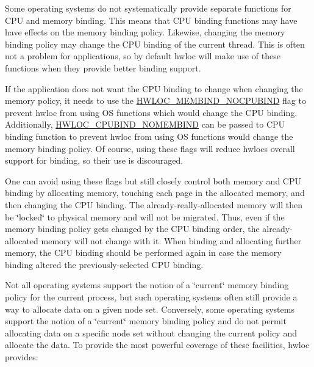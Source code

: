 

Some operating systems do not systematically provide separate functions for C\+PU and memory binding. This means that C\+PU binding functions may have have effects on the memory binding policy. Likewise, changing the memory binding policy may change the C\+PU binding of the current thread. This is often not a problem for applications, so by default hwloc will make use of these functions when they provide better binding support.

If the application does not want the C\+PU binding to change when changing the memory policy, it needs to use the \hyperlink{a00191_ggab00475fd98815bf4fb9aaf752030e7d2aad6b9eaf2ee324ca58dc8f58094b9997}{H\+W\+L\+O\+C\+\_\+\+M\+E\+M\+B\+I\+N\+D\+\_\+\+N\+O\+C\+P\+U\+B\+I\+ND} flag to prevent hwloc from using OS functions which would change the C\+PU binding. Additionally, \hyperlink{a00190_gga217dc8d373f8958cc93c154ebce1c71ca41ce440443cc3087caed95ab60edcad6}{H\+W\+L\+O\+C\+\_\+\+C\+P\+U\+B\+I\+N\+D\+\_\+\+N\+O\+M\+E\+M\+B\+I\+ND} can be passed to C\+PU binding function to prevent hwloc from using OS functions would change the memory binding policy. Of course, using these flags will reduce hwloc\textquotesingle{}s overall support for binding, so their use is discouraged.

One can avoid using these flags but still closely control both memory and C\+PU binding by allocating memory, touching each page in the allocated memory, and then changing the C\+PU binding. The already-\/really-\/allocated memory will then be \char`\"{}locked\char`\"{} to physical memory and will not be migrated. Thus, even if the memory binding policy gets changed by the C\+PU binding order, the already-\/allocated memory will not change with it. When binding and allocating further memory, the C\+PU binding should be performed again in case the memory binding altered the previously-\/selected C\+PU binding.

Not all operating systems support the notion of a \char`\"{}current\char`\"{} memory binding policy for the current process, but such operating systems often still provide a way to allocate data on a given node set. Conversely, some operating systems support the notion of a \char`\"{}current\char`\"{} memory binding policy and do not permit allocating data on a specific node set without changing the current policy and allocate the data. To provide the most powerful coverage of these facilities, hwloc provides\+:


